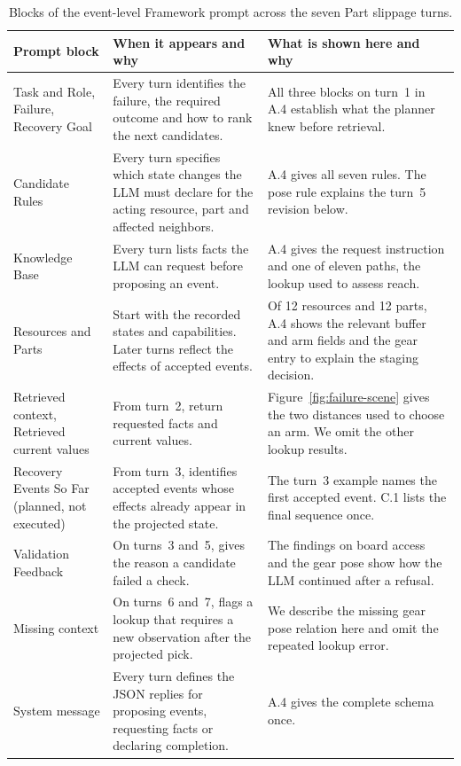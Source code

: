 \documentclass[preprint,12pt,authoryear]{elsarticle}
\begin{document}
\begin{table}[ht!]
\centering\small
\caption{Blocks of the event-level Framework prompt across the seven Part slippage turns.}\label{tab:outline-blocks}
\begin{tabularx}{\linewidth}{@{}>{\raggedright\arraybackslash}p{.235\linewidth}YY@{}}
\toprule
Prompt block & When it appears and why & What is shown here and why \\
\midrule
Task and Role, Failure, Recovery Goal & Every turn identifies the failure, the required outcome and how to rank the next candidates. & All three blocks on turn~1 in A.4 establish what the planner knew before retrieval. \\
\addlinespace
Candidate Rules & Every turn specifies which state changes the LLM must declare for the acting resource, part and affected neighbors. & A.4 gives all seven rules. The pose rule explains the turn~5 revision below. \\
\addlinespace
Knowledge Base & Every turn lists facts the LLM can request before proposing an event. & A.4 gives the request instruction and one of eleven paths, the lookup used to assess reach. \\
\addlinespace
Resources and Parts & Start with the recorded states and capabilities. Later turns reflect the effects of accepted events. & Of 12 resources and 12 parts, A.4 shows the relevant buffer and arm fields and the gear entry to explain the staging decision. \\
\addlinespace
Retrieved context, Retrieved current values & From turn~2, return requested facts and current values. & Figure~\ref{fig:failure-scene} gives the two distances used to choose an arm. We omit the other lookup results. \\
\addlinespace
Recovery Events So Far (planned, not executed) & From turn~3, identifies accepted events whose effects already appear in the projected state. & The turn~3 example names the first accepted event. C.1 lists the final sequence once. \\
\addlinespace
Validation Feedback & On turns~3 and~5, gives the reason a candidate failed a check. & The findings on board access and the gear pose show how the LLM continued after a refusal. \\
\addlinespace
Missing context & On turns~6 and~7, flags a lookup that requires a new observation after the projected pick. & We describe the missing gear pose relation here and omit the repeated lookup error. \\
\addlinespace
System message & Every turn defines the JSON replies for proposing events, requesting facts or declaring completion. & A.4 gives the complete schema once. \\
\bottomrule
\end{tabularx}
\end{table}
\end{document}
